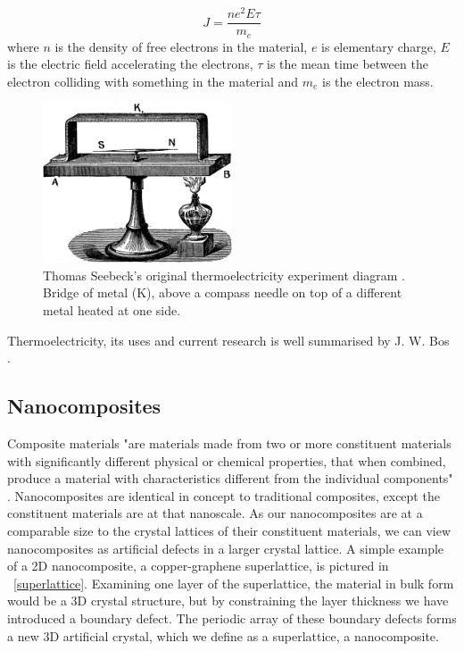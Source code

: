 \documentclass[a4paper,10pt,journal]{IEEEtran}
\newcommand{\figref}[2][\figurename~]{#1\ref{#2}}
\begin{document}
\begin{equation}
\label{micro-ohm}
	J = \frac{ne^2E \tau}{m_e}
\end{equation}
where $n$ is the density of free electrons in the material, $e$ is
elementary charge, $E$ is the electric field accelerating the
electrons, $\tau$ is the mean time between the electron colliding with
something in the material and $m_e$ is the electron mass.

\begin{figure}
	\centering
	\includegraphics[width=0.5\textwidth]{seebeck-experiment-black.png}
	\caption{Thomas Seebeck's original thermoelectricity experiment
	diagram \cite{seebeck-original}. Bridge of metal (K), above a compass
	needle on top of a different metal heated at one side.}
	\label{seebeck-experiment}
\end{figure}

Thermoelectricity, its uses and current research is well summarised by
J. W. Bos \cite{rsc-eic}.

\subsection{Nanocomposites}
Composite materials "are materials made from two or more constituent
materials with significantly different physical or chemical
properties, that when combined, produce a material with
characteristics different from the individual
components" \cite{wiki-composite}. Nanocomposites are identical in
concept to traditional composites, except the constituent materials
are at that nanoscale. As our nanocomposites are at a comparable size
to the crystal lattices of their constituent materials, we can view
nanocomposites as artificial defects in a larger crystal lattice. A
simple example of a 2D nanocomposite, a copper-graphene superlattice,
is pictured in \figref{superlattice}. Examining one layer of the
superlattice, the material in bulk form would be a 3D crystal structure,
but by constraining the layer thickness we have introduced a boundary
defect. The periodic array of these boundary defects forms a new 3D
artificial crystal, which we define as a superlattice, a nanocomposite.
\end{document}
